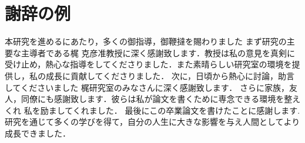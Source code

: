 \chapter*{謝辞の例}

本研究を進めるにあたり，多くの御指導，御鞭撻を賜わりました
まず研究の主要な主導者である梶 克彦准教授に深く感謝致します．教授は私の意見を真剣に受け止め，熱心な指導をしてくださりました．また素晴らしい研究室の環境を提供し，私の成長に貢献してくださりました．
次に，日頃から熱心に討論，助言してくださいました
梶研究室のみなさんに深く感謝致します．
さらに家族，友人，同僚にも感謝致します．彼らは私が論文を書くために専念できる環境を整えくれ
私を励ましてくれました．
最後にこの卒業論文を書けたことに感謝します.
研究を通じて多くの学びを得て，自分の人生に大きな影響を与え人間としてより成長できました．





